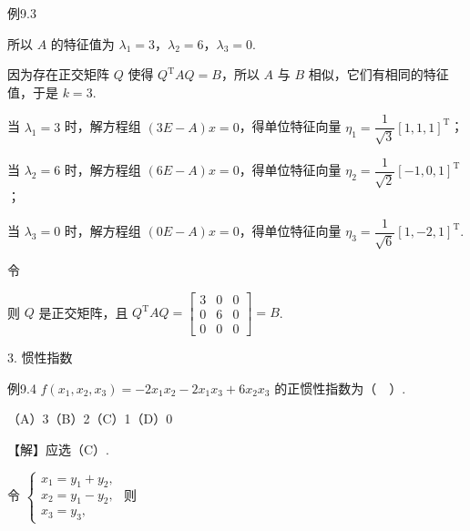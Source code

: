 \begin{fcard}{例9.3}

所以 $A$ 的特征值为 $\lambda_1=3$，$\lambda_2=6$，$\lambda_3=0$.


因为存在正交矩阵 $Q$ 使得 $Q^{\mathrm T}AQ=B$，所以 $A$ 与 $B$ 相似，它们有相同的特征值，于是 $k=3$.

当 $\lambda_1=3$ 时，解方程组 $(3E-A)x=0$，得单位特征向量 $\eta_1=\dfrac{1}{\sqrt3}[1,1,1]^{\mathrm T}$；

当 $\lambda_2=6$ 时，解方程组 $(6E-A)x=0$，得单位特征向量 $\eta_2=\dfrac{1}{\sqrt2}[-1,0,1]^{\mathrm T}$；

当 $\lambda_3=0$ 时，解方程组 $(0E-A)x=0$，得单位特征向量 $\eta_3=\dfrac{1}{\sqrt6}[1,-2,1]^{\mathrm T}$.


令


则 $Q$ 是正交矩阵，且 $Q^{\mathrm T}AQ=\begin{bmatrix}3&0&0\\0&6&0\\0&0&0\end{bmatrix}=B$.
\end{fcard}

3. 惯性指数

\begin{fcard}{例9.4}
$f(x_1,x_2,x_3)=-2x_1x_2-2x_1x_3+6x_2x_3$ 的正惯性指数为（$\quad$）.

（A）3\qquad（B）2\qquad（C）1\qquad（D）0

【解】应选（C）.

令 $\begin{cases}x_1=y_1+y_2,\\[2pt]x_2=y_1-y_2,\\[2pt]x_3=y_3,\end{cases}$ 则


\end{fcard}

